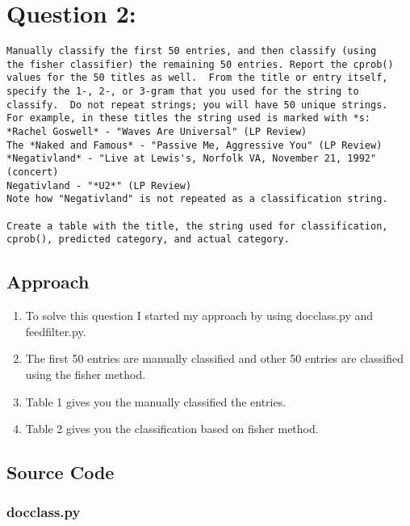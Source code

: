 \documentclass[12pt]{article}
\begin{document}
\newpage
\section{Question 2:}
\begin{verbatim}
Manually classify the first 50 entries, and then classify (using
the fisher classifier) the remaining 50 entries. Report the cprob()
values for the 50 titles as well.  From the title or entry itself,
specify the 1-, 2-, or 3-gram that you used for the string to
classify.  Do not repeat strings; you will have 50 unique strings.
For example, in these titles the string used is marked with *s:
*Rachel Goswell* - "Waves Are Universal" (LP Review) 
The *Naked and Famous* - "Passive Me, Aggressive You" (LP Review)
*Negativland* - "Live at Lewis's, Norfolk VA, November 21, 1992" (concert)
Negativland - "*U2*" (LP Review)
Note how "Negativland" is not repeated as a classification string.

Create a table with the title, the string used for classification,
cprob(), predicted category, and actual category.
\end{verbatim}

\subsection{Approach}
\begin{enumerate}
    \item To solve this question I started my approach by using docclass.py and feedfilter.py.
    \item The first 50 entries are manually classified and other 50 entries are classified using the fisher method.
    \item Table 1 gives you the manually classified the entries.
    \item Table 2 gives you the classification based on fisher method.
\end{enumerate}
\newpage
\subsection{Source Code}
\subsubsection{docclass.py}

\newpage
\end{document}
